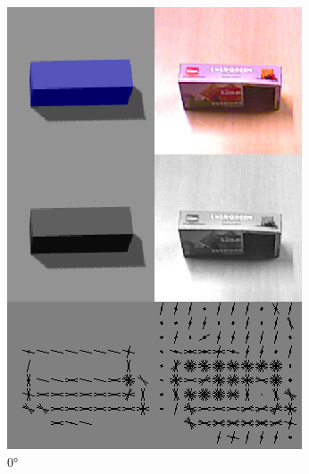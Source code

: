 \documentclass[letterpaper, 10 pt, conference]{conf/ieeeconf}  %
\begin{document}
\begin{figure}[H]
  \centering
  \begin{subfigure}[b]{0.238\textwidth}
    \includegraphics[width=\textwidth]{simulation_vs_real_world_base_case.png}
    \caption{\label{fig:simulation_vs_real_world_0}\ang{0}}
  \end{subfigure}
  \begin{subfigure}[b]{0.238\textwidth}

\end{subfigure}
\end{figure}
\end{document}

